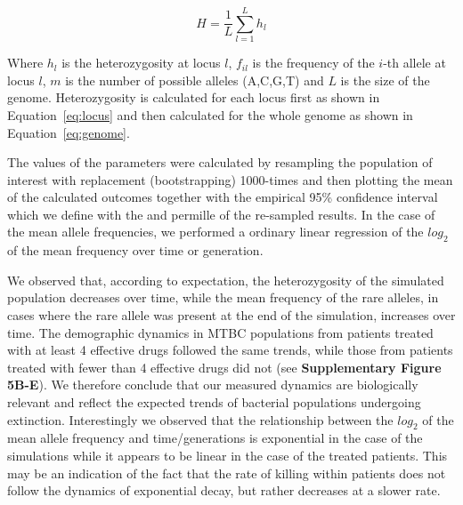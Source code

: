 \documentclass[12pt, oneside]{article}   	%
\begin{document}
\begin{equation} \label{eq:genome}
H = \frac{1}{L}\sum^L_{l=1}h_l
\end{equation}

Where $h_l$ is the heterozygosity at locus $l$, $f_{il}$ is the frequency of the $i$-th allele at locus $l$, $m$ is the number of possible alleles (A,C,G,T) and $L$ is the size of the genome. Heterozygosity is calculated for each locus first as shown in Equation~\ref{eq:locus} and then calculated for the whole genome as shown in Equation~\ref{eq:genome}.

The values of the parameters were calculated by resampling the population of interest with replacement (bootstrapping) 1000-times and then plotting the mean of the calculated outcomes together with the empirical 95\% confidence interval which we define with the  and  permille of the re-sampled results. In the case of the mean allele frequencies, we performed a ordinary linear regression of the $log_2$ of the mean frequency over time or generation.

We observed that, according to expectation, the heterozygosity of the simulated population decreases over time, while the mean frequency of the rare alleles, in cases where the rare allele was present at the end of the simulation, increases over time. The demographic dynamics in MTBC populations from patients treated with at least 4 effective drugs followed the same trends, while those from patients treated with fewer than 4 effective drugs did not (see \textbf{Supplementary Figure 5B-E}). We therefore conclude that our measured dynamics are biologically relevant and reflect the expected trends of bacterial populations undergoing extinction. Interestingly we observed that the relationship between the $log_2$ of the mean allele frequency and time/generations is exponential in the case of the simulations while it appears to be linear in the case of the treated patients. This may be an indication of the fact that the rate of killing within patients does not follow the dynamics of exponential decay, but rather decreases at a slower rate.
\end{document}
